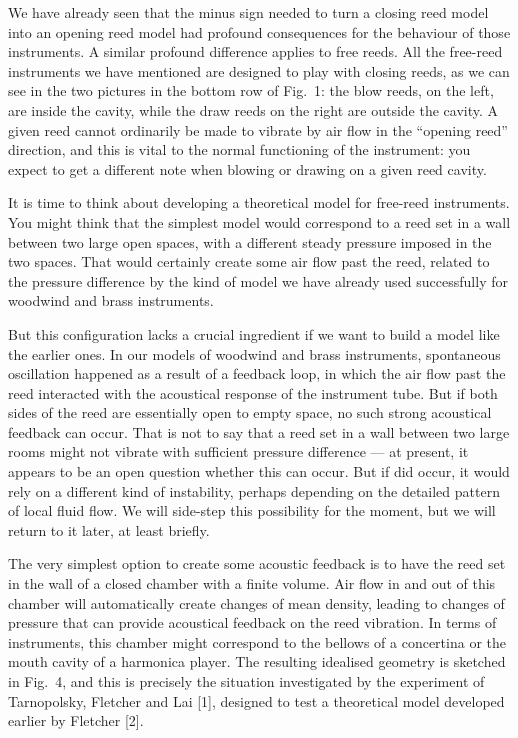 
  We have already seen that the minus sign needed to turn a closing reed model 
  into an opening reed model had profound consequences for the behaviour of 
  those instruments. A similar profound difference applies to free reeds. All 
  the free-reed instruments we have mentioned are designed to play with closing 
  reeds, as we can see in the two pictures in the bottom row of Fig.\ 1: the 
  blow reeds, on the left, are inside the cavity, while the draw reeds on the 
  right are outside the cavity. A given reed cannot ordinarily be made to 
  vibrate by air flow in the ``opening reed'' direction, and this is vital to 
  the normal functioning of the instrument: you expect to get a different note 
  when blowing or drawing on a given reed cavity. 

  It is time to think about developing a theoretical model for free-reed 
  instruments. You might think that the simplest model would correspond to a 
  reed set in a wall between two large open spaces, with a different steady 
  pressure imposed in the two spaces. That would certainly create some air flow 
  past the reed, related to the pressure difference by the kind of model we 
  have already used successfully for woodwind and brass instruments. 

  But this configuration lacks a crucial ingredient if we want to build a model 
  like the earlier ones. In our models of woodwind and brass instruments, 
  spontaneous oscillation happened as a result of a feedback loop, in which the 
  air flow past the reed interacted with the acoustical response of the 
  instrument tube. But if both sides of the reed are essentially open to empty 
  space, no such strong acoustical feedback can occur. That is not to say that 
  a reed set in a wall between two large rooms might not vibrate with 
  sufficient pressure difference — at present, it appears to be an open 
  question whether this can occur. But if did occur, it would rely on a 
  different kind of instability, perhaps depending on the detailed pattern of 
  local fluid flow. We will side-step this possibility for the moment, but we 
  will return to it later, at least briefly. 

  The very simplest option to create some acoustic feedback is to have the reed 
  set in the wall of a closed chamber with a finite volume. Air flow in and out 
  of this chamber will automatically create changes of mean density, leading to 
  changes of pressure that can provide acoustical feedback on the reed 
  vibration. In terms of instruments, this chamber might correspond to the 
  bellows of a concertina or the mouth cavity of a harmonica player. The 
  resulting idealised geometry is sketched in Fig.\ 4, and this is precisely 
  the situation investigated by the experiment of Tarnopolsky, Fletcher and Lai 
  [1], designed to test a theoretical model developed earlier by Fletcher [2]. 

